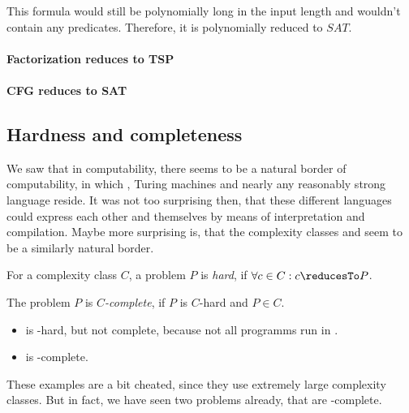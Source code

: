 This formula would still be polynomially long in the input length and 
wouldn't contain any predicates. Therefore, it is polynomially reduced 
to $SAT$.
\DONE
\paragraph{Factorization reduces to TSP}
\TODO
\paragraph{CFG reduces to SAT}
\TODO

\subsection{Hardness and completeness}
We saw that in computability, there seems to be a natural border of 
computability, in which \WHILE, Turing machines and nearly any reasonably 
strong language reside. It was not too surprising then, that these different 
languages could express each other and themselves by means of interpretation and
compilation. Maybe more surprising is, that the complexity classes \PTIME and 
\NPTIME seem to be a similarly natural border.

\begin{defn}
	For a complexity class $C$, a problem $P$ is \emph{hard}, if 
	$\forall c\in C: c \reducesTo P$.

	The problem $P$ is \emph{$C$-complete}, if $P$ is $C$-hard and $P\in C$.
\end{defn}
\begin{example}
	\begin{itemize}
		\item \FOR is \PTIME-hard, but not complete, because not all \FOR programms run in \PTIME.
		\item \TM is \WHILE-complete.
	\end{itemize}
\end{example}
These examples are a bit cheated, since they use extremely large complexity 
classes. But in fact, we have seen two problems already, that are \NPTIME-complete.

